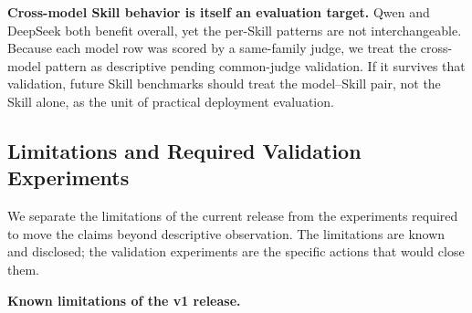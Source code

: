 \documentclass[10pt]{article}
\begin{document}
\textbf{Cross-model Skill behavior is itself an evaluation target.}
Qwen and DeepSeek both benefit overall, yet the per-Skill patterns are not interchangeable. Because each model row was scored by a same-family judge, we treat the cross-model pattern as descriptive pending common-judge validation. If it survives that validation, future Skill benchmarks should treat the model--Skill pair, not the Skill alone, as the unit of practical deployment evaluation.

\subsection{Limitations and Required Validation Experiments}

We separate the limitations of the current release from the experiments required to move the claims beyond descriptive observation. The limitations are known and disclosed; the validation experiments are the specific actions that would close them.

\textbf{Known limitations of the v1 release.}
\end{document}
